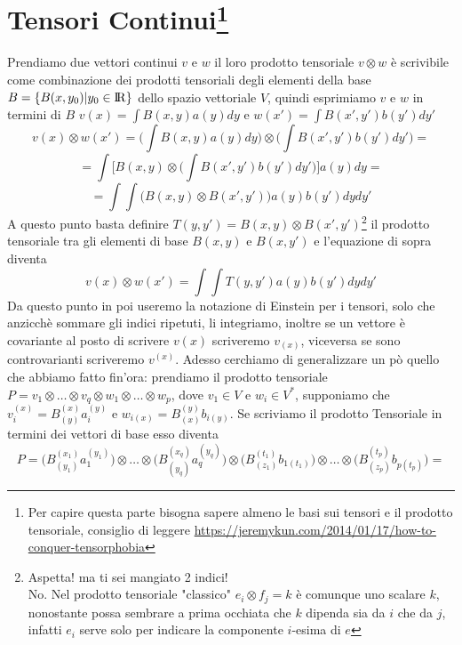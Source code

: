 \documentclass[11pt,a4paper]{article}
\theoremstyle{definition}
\theoremstyle{plain}
\theoremstyle{plain}
\begin{document}
	\section{Tensori Continui\protect\footnote{Per capire questa parte bisogna sapere almeno le basi sui tensori e il prodotto tensoriale, consiglio di leggere \href{url}{https://jeremykun.com/2014/01/17/how-to-conquer-tensorphobia}}}
		Prendiamo due vettori continui $v$ e $w$ il loro prodotto tensoriale $v\otimes w$ è scrivibile come combinazione dei prodotti tensoriali degli elementi della base $B=\{B(x,y_0)|y_0\in \rm I\!R\}$ dello spazio vettoriale $V$, quindi esprimiamo $v$ e $w$ in termini di $B$ $v(x)=\int B(x,y)a(y)dy$ e $w(x')=\int B(x',y')b(y')dy'$
		\[
			v(x)\otimes w(x')=\bigg(\int B(x,y)a(y)dy \bigg)\otimes \bigg(\int B(x',y')b(y')dy'\bigg)=
		\]
		\[
			=\int \bigg[B(x,y)\otimes\bigg(\int B(x',y')b(y')dy'\bigg)\bigg]a(y)dy=
		\]
		\[
			=\int \int \bigg(B(x,y)\otimes B(x',y')\bigg)a(y)b(y')dydy'
		\]
		A questo punto basta definire $T(y,y')=B(x,y)\otimes B(x',y')$\footnote{Aspetta! ma ti sei mangiato 2 indici!\\ No. Nel prodotto tensoriale "classico" $e_i\otimes f_j=k$ è comunque uno scalare $k$, nonostante possa sembrare a prima occhiata che $k$ dipenda sia da $i$ che da $j$, infatti $e_i$ serve solo per indicare la componente $i$-esima di $e$} il prodotto tensoriale tra gli elementi di base $B(x,y)$ e $B(x,y')$ e l'equazione di sopra diventa
		\begin{equation}
			v(x)\otimes w(x')=\int \int T(y,y')a(y)b(y')dydy'
		\end{equation}
		Da questo punto in poi useremo la notazione di Einstein per i tensori, solo che anzicchè sommare gli indici ripetuti, li integriamo, inoltre se un vettore è covariante al posto di scrivere $v(x)$ scriveremo $v_{(x)}$, viceversa se sono controvarianti scriveremo $v^{(x)}$.\newline
		Adesso cerchiamo di generalizzare un pò quello che abbiamo fatto fin'ora: prendiamo il prodotto tensoriale $P=v_1\otimes\dots\otimes v_q\otimes w_1\otimes\dots\otimes w_p$, dove $v_1\in V$ e $w_i\in V^*$, supponiamo che $v_i^{(x)}=B^{(x)}_{(y)}a_i^{(y)}$ e $w_{i(x)}=B_{(x)}^{(y)}b_{i(y)}$.\newline
		Se scriviamo il prodotto Tensoriale in termini dei vettori di base esso diventa
		\[
			P=\Big(B^{(x_1)}_{(y_1)}a_1^{(y_1)}\Big)\otimes\dots\otimes\Big(B^{(x_q)}_{(y_q)}a_q^{(y_q)}\Big)\otimes\Big(B_{(z_1)}^{(t_1)}b_{1(t_1)}\Big)\otimes\dots\otimes\Big(B_{(z_p)}^{(t_p)}b_{p(t_p)}\Big)=
		\]
\end{document}
